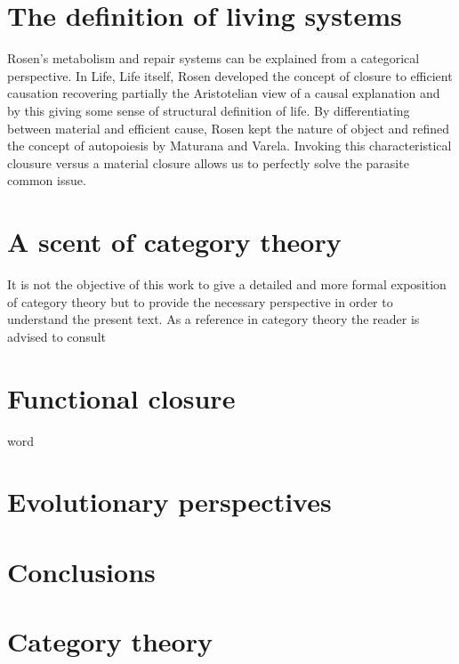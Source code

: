 \documentclass[aps,twocolumn]{revtex4-1}
\begin{document}
\section{The definition of living systems}

Rosen's metabolism and repair systems can be explained from a categorical perspective. In Life, Life itself, Rosen developed the concept of closure to efficient causation recovering partially the Aristotelian view of a causal explanation and by this giving some sense of structural definition of life. By differentiating between material and efficient cause, Rosen kept the nature of object and refined the concept of autopoiesis by Maturana and Varela. Invoking this characteristical clousure versus a material closure allows us to perfectly solve the parasite common issue.

\section{A scent of category theory}

It is not the objective of this work to give a detailed and more formal exposition of category theory but to provide the necessary perspective in order to understand the present text. As a reference in category theory the reader is advised to consult

\section{Functional closure}

word

\section{Evolutionary perspectives}

\section{Conclusions}


 



\appendix

\section{Category theory}\label{app:CatTh}


%
\end{document}
